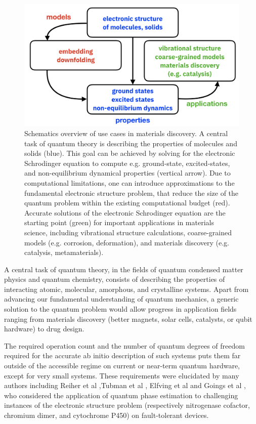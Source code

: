 \begin{figure}
\includegraphics[width=\columnwidth]{groups/2._Use_case_discovery/map.png}
\caption{Schematics overview of use cases in materials discovery.  A central task of quantum theory is describing the properties of molecules and solids (blue). This goal can be achieved by solving for the electronic Schrodinger equation to compute e.g. ground-state, excited-states, and non-equilibrium dynamical properties (vertical arrow). Due to computational limitations, one can introduce approximations to the fundamental electronic structure problem, that reduce the size of the quantum problem within the existing computational budget (red).
Accurate solutions of the electronic Schrodinger equation are the starting point (green) for important applications in materials science, including vibrational structure calculations, coarse-grained models (e.g. corrosion, deformation), and materials discovery (e.g. catalysis, metamaterials).
}
\label{fig:map}
\end{figure}

A central task of quantum theory, in the fields of quantum condensed matter physics and quantum chemistry, consists of describing the properties of interacting atomic, molecular, amorphous, and crystalline systems. Apart from advancing our fundamental understanding of quantum mechanics, a generic solution to the quantum problem would allow progress in application fields ranging from materials discovery (better magnets, solar cells, catalysts, or qubit hardware) to drug design.

The required operation count and the number of quantum degrees of freedom required for the accurate ab initio description of such systems puts them far outside of the accessible regime on current or near-term quantum hardware, except for very small systems. These requirements were elucidated by many authors including Reiher et al \cite{reiher2017elucidating},Tubman et al \cite{2018arXiv180905523T}, Elfving et al \cite{elfving2020will} and Goings et al \cite{goings2022reliably}, who considered the application of quantum phase estimation to challenging instances of the electronic structure problem (respectively nitrogenase cofactor, chromium dimer, and cytochrome P450) on fault-tolerant devices.

